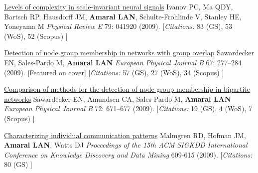 \NumberedItem{\makebox[0.8cm][r]{[82]}}
\href{/people/amaral/levels-of-complexity-in-scale-invariant-neural-signals}
{Levels of complexity in scale-invariant neural signals}
\newline
Ivanov PC, Ma QDY, Bartsch RP, Hausdorff JM, {\textbf{Amaral LAN}}, Schulte-Frohlinde V, Stanley HE, Yoneyama M
\newline
\textit{Physical Review E}
    79:
041920 (2009).
    \newline
    \hfill [{\em{Citations:}} 83 (GS),
    53 (WoS), 52 (Scopus)
    ]
\newline
\Gap
~
\Gap

\NumberedItem{\makebox[0.8cm][r]{[81]}}
\href{/people/amaral/detection-of-node-group-membership-in-networks-with-group-overlap}
{Detection of node group membership in networks with group overlap}
\newline
Sawardecker EN, Sales-Pardo M, {\textbf{Amaral LAN}}
\newline
\textit{European Physical Journal B}
    67:
277--284 (2009).
    [Featured on cover]
    \newline
    \hfill [{\em{Citations:}} 57 (GS),
    27 (WoS), 34 (Scopus)
    ]
\newline
\Gap
~
\Gap

\NumberedItem{\makebox[0.8cm][r]{[80]}}
\href{/people/amaral/comparison-of-methods-for-the-detection-of-node-group-membership-in-bipartite-networks}
{Comparison of methods for the detection of node group membership in bipartite networks}
\newline
Sawardecker EN, Amundsen CA, Sales-Pardo M, {\textbf{Amaral LAN}}
\newline
\textit{European Physical Journal B}
    72:
671--677 (2009).
    \newline
    \hfill [{\em{Citations:}} 19 (GS),
    4 (WoS), 7 (Scopus)
    ]
\newline
\Gap
~
\Gap

\NumberedItem{\makebox[0.8cm][r]{[79]}}
\href{/people/amaral/characterizing-individual-communication-patterns}
{Characterizing individual communication patterns}
\newline
Malmgren RD, Hofman JM, {\textbf{Amaral LAN}}, Watts DJ
\newline
\textit{Proceedings of the 15th ACM SIGKDD International Conference on Knowledge Discovery and Data Mining}
609-615 (2009).
    \newline
    \hfill [{\em{Citations:}} 80 (GS)
    ]
\newline
\Gap
~
\Gap

